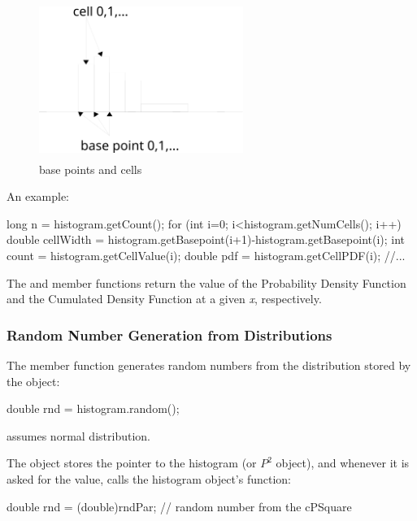 \begin{figure}[htbp]
  \begin{center}
    \includegraphics[width=2.615in, height=2.001in]{figures/simlib-histogramcells}
    \caption{base points and cells}
  \end{center}
\end{figure}

An example:

\begin{cpp}
long n = histogram.getCount();
for (int i=0; i<histogram.getNumCells(); i++)
{
  double cellWidth = histogram.getBasepoint(i+1)-histogram.getBasepoint(i);
  int count = histogram.getCellValue(i);
  double pdf = histogram.getCellPDF(i);
  //...
}
\end{cpp}


The  and  member functions
return the value of the Probability Density Function and the Cumulated
Density Function at a given \textit{x}, respectively.


\subsubsection{Random Number Generation from Distributions}


The  member function generates random
numbers from the distribution stored by the
object:

\begin{cpp}
double rnd = histogram.random();
\end{cpp}


 assumes normal distribution.

The  object stores the pointer to the histogram (or $P^{2}$ object),
and whenever it is asked for the value, calls the histogram object's 
function:

\begin{cpp}
double rnd = (double)rndPar; // random number from the cPSquare
\end{cpp}

